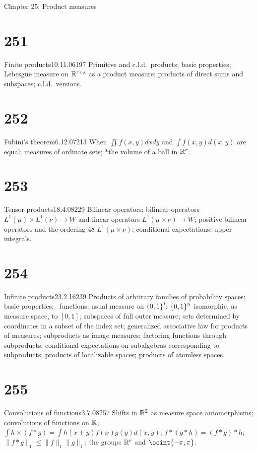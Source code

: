
 Chapter 25:  Product measures


\section{251}{Finite products}{10.11.06}{197}{}
{Primitive and c.l.d.\ products;  basic properties;  Lebesgue
measure on $\Bbb{R}^{r+s}$ as a product measure;  products of direct sums
and subspaces;  c.l.d.\ versions.}

\section{252}{Fubini's theorem}{6.12.07}{213}{}
{When ${\iint}f(x,y)dxdy$ and ${\int}f(x,y)d(x,y)$ are equal;  measures
of ordinate sets;  *the volume of a ball in $\Bbb{R}^r$.}

\section{253}{Tensor products}{18.4.08}{229}{}
{Bilinear operators;  bilinear operators $L^1(\mu){\times}L^1(\nu){\to}W$
and linear operators $L^1(\mu\times\nu){\to}W$;  positive bilinear
operators and the ordering 48 $L^1(\mu\times\nu)$;
conditional expectations;  upper integrals.}

\section{254}{Infinite products}{23.2.16}{239}{}
{Products of arbitrary families of probability spaces;  basic
properties;  \imp\ functions;  usual measure on $\{0,1\}^I$;
$\{0,1\}^{\Bbb{N}}$ isomorphic, as measure space, to $[0,1]$;  subspaces
of full outer measure;  sets determined by coordinates in
a subset of the index set;  generalized associative law for products of
measures;  subproducts as image measures;  factoring functions through
subproducts;  conditional expectations on subalgebras corresponding to
subproducts;  products of localizable spaces;  products of atomless spaces.}

\section{255}{Convolutions of functions}{3.7.08}{257}{}
{Shifts in $\Bbb{R}^2$ as measure space automorphisms;
convolutions of functions on $\Bbb{R}$;
${\int}h\times(f*g)={\int}h(x+y)f(x)g(y)d(x,y)$;  $f*(g*h)=(f*g)*h$;
$\|f*g\|_1\le
\|f\|_1\|g\|_1$;  %
the groups $\Bbb{R}^r$ and $\ocint{-\pi,\pi}$.}

